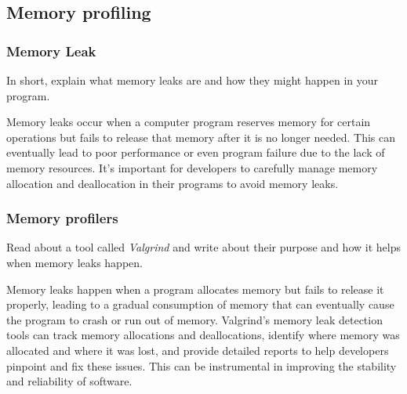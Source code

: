 \documentclass[titlepage]{article}
\begin{document}
	\subsection{Memory profiling}
	\subsubsection{Memory Leak}
	In short, explain what memory leaks are and how they might happen in your program.
	
	Memory leaks occur when a computer program reserves memory for certain operations but fails to release that memory after it is no longer needed. This can eventually lead to poor performance or even program failure due to the lack of memory resources. It's important for developers to carefully manage memory allocation and deallocation in their programs to avoid memory leaks.
	
	\subsubsection{Memory profilers}
	Read about a tool called \textit{Valgrind} and write about their purpose and how it helps when memory leaks happen.
	
	Memory leaks happen when a program allocates memory but fails to release it properly, leading to a gradual consumption of memory that can eventually cause the program to crash or run out of memory. Valgrind's memory leak detection tools can track memory allocations and deallocations, identify where memory was allocated and where it was lost, and provide detailed reports to help developers pinpoint and fix these issues. This can be instrumental in improving the stability and reliability of software. 
	
	
	
	
	
	
\end{document}
